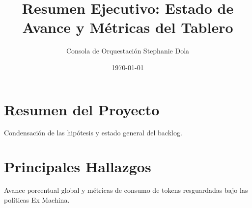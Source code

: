 \documentclass{article}
\title{Resumen Ejecutivo: Estado de Avance y Métricas del Tablero}
\author{Consola de Orquestación Stephanie Dola}
\date{\today}
\begin{document}
\maketitle

\section{Resumen del Proyecto}
Condensación de las hipótesis y estado general del backlog.

\section{Principales Hallazgos}
Avance porcentual global y métricas de consumo de tokens resguardadas bajo las políticas Ex Machina.
\end{document}
